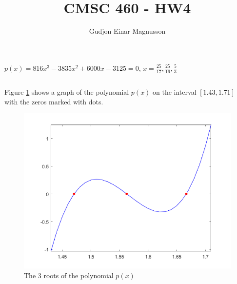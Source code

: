 \documentclass[12pt]{article}
\begin{document}
\title{CMSC 460 - HW4}
\author{Gudjon Einar Magnusson}

\maketitle

\section{}

\subsection{}

$p(x) = 816x^3 - 3835x^2 + 6000x - 3125 = 0$, $x = \frac{25}{17}, \frac{25}{16}, \frac{5}{3}$

\subsection{}

Figure \ref{px_roots} shows a graph of the polynomial $p(x)$ on the interval $[1.43, 1.71]$ with the zeros marked with dots.

\begin{figure}
    \includegraphics[width=0.6\linewidth]{px_plot}
    \centering
    \caption{The 3 roots of the polynomial $p(x)$}
    \label{px_roots}
\end{figure}

\subsection{}
\end{document}
